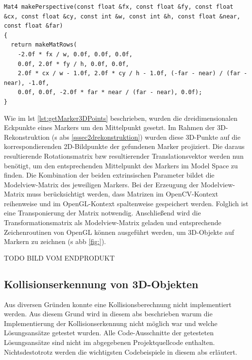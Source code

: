 \begin{lstlisting}[caption={Die Funktion \texttt{algebra.cpp/makePerspective();}, die anhand von intrinsischen Parametern eine perspektivische Projektionsmatrix im OpenGL-Kontext erzeugt}, label={lst:makePerspective}]
Mat4 makePerspective(const float &fx, const float &fy, const float &cx, const float &cy, const int &w, const int &h, const float &near, const float &far)
{
  return makeMatRows(
    -2.0f * fx / w, 0.0f, 0.0f, 0.0f,
    0.0f, 2.0f * fy / h, 0.0f, 0.0f,
    2.0f * cx / w - 1.0f, 2.0f * cy / h - 1.0f, (-far - near) / (far - near), -1.0f,
    0.0f, 0.0f, -2.0f * far * near / (far - near), 0.0f);
}
\end{lstlisting}

\noindent Wie im \acs{lst} \ref{lst:getMarker3DPoints} beschrieben, wurden die dreidimensionalen Eckpunkte eines Markers um den Mittelpunkt gesetzt. Im Rahmen der 3D-Rekonstruktion (\acs{s} \acs{abs} \ref{sssec2drekonstruktion}) wurden diese 3D-Punkte auf die korrespondierenden 2D-Bildpunkte der gefundenen Marker projiziert. Die daraus resultierende Rotationsmatrix \acs{bzw} resultierender Translationsvektor werden nun benötigt, um den entsprechenden Mittelpunkt des Markers im Model Space zu finden. Die Kombination der beiden extrinsischen Parameter bildet die Modelview-Matrix des jeweiligen Markers. Bei der Erzeugung der Modelview-Matrix muss berücksichtigt werden, dass Matrizen im OpenCV-Kontext reihenweise und im OpenGL-Kontext spaltenweise gespeichert werden. Folglich ist eine Transponierung der Matrix notwendig. Anschließend wird die Transformationsmatrix als Modelview-Matrix geladen und entsprechende Zeichenroutinen von OpenGL können ausgeführt werden, um 3D-Objekte auf Markern zu zeichnen (\acs{s} \acs{abb} \ref{fig:}).

TODO BILD VOM ENDPRODUKT

\subsection{Kollisionserkennung von 3D-Objekten}\label{kollitionerkennungnnnn}
Aus diversen Gründen konnte eine Kollisionsberechnung nicht implementiert werden. Aus diesem Grund wird in diesem \acs{abs} beschrieben warum die Implementierung der Kollisionserkennung nicht möglich war und welche Lösungsansätze getestet wurden. Alle Code-Ausschnitte der getesteten Lösungsansätze sind nicht im abgegebenen Projektquellcode enthalten. Nichtsdestotrotz werden die wichtigsten Codebeispiele in diesem \acs{abs} erläutert.

